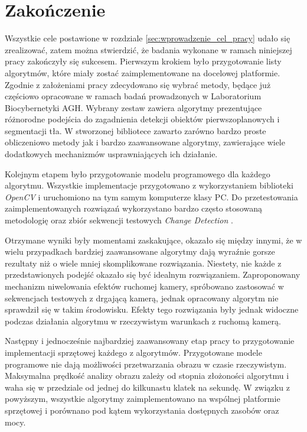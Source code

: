 \chapter{Zakończenie}
\label{cha:zakonczenie}

Wszystkie cele postawione w rozdziale \ref{sec:wprowadzenie_cel_pracy} udało się zrealizować, zatem można stwierdzić, że badania wykonane w ramach niniejszej pracy zakończyły się sukcesem. Pierwszym krokiem było przygotowanie listy algorytmów, które miały zostać zaimplementowane na docelowej platformie. Zgodnie z założeniami pracy zdecydowano się wybrać metody, będące już częściowo opracowane w ramach badań prowadzonych w Laboratorium Biocybernetyki AGH. Wybrany zestaw zawiera algorytmy prezentujące różnorodne podejścia do zagadnienia detekcji obiektów pierwszoplanowych i segmentacji tła. W stworzonej bibliotece zawarto zarówno bardzo proste obliczeniowo metody jak i bardzo zaawansowane algorytmy, zawierające wiele dodatkowych mechanizmów usprawniających ich działanie.

Kolejnym etapem było przygotowanie modelu programowego dla każdego algorytmu. Wszystkie implementacje przygotowano z wykorzystaniem biblioteki \textit{OpenCV} i uruchomiono na tym samym komputerze klasy PC. Do przetestowania zaimplementowanych rozwiązań wykorzystano bardzo często stosowaną metodologię \cite{changedetection_15} oraz zbiór sekwencji testowych \textit{Change Detection} \cite{change_detection_web}. 

Otrzymane wyniki były momentami zaskakujące, okazało się między innymi, że w wielu przypadkach bardziej zaawansowane algorytmy dają wyraźnie gorsze rezultaty niż o wiele mniej skomplikowane rozwiązania. 
Niestety, nie każde z przedstawionych podejść okazało się być idealnym rozwiązaniem. 
Zaproponowany mechanizm niwelowania efektów ruchomej kamery, spróbowano zastosować w sekwencjach testowych z drgającą kamerą, jednak opracowany algorytm nie sprawdził się w takim środowisku.
Efekty tego rozwiązania były jednak widoczne podczas działania algorytmu w rzeczywistym warunkach z ruchomą kamerą. 

Następny i jednocześnie najbardziej zaawansowany etap pracy to przygotowanie implementacji sprzętowej każdego z algorytmów. Przygotowane modele programowe nie dają możliwości przetwarzania obrazu w czasie rzeczywistym. Maksymalna prędkość analizy obrazu zależy od stopnia złożoności algorytmu i waha się w przedziale od jednej do kilkunastu klatek na sekundę. W związku z powyższym, wszystkie algorytmy zaimplementowano na wspólnej platformie sprzętowej i porównano pod kątem wykorzystania dostępnych zasobów oraz mocy.

